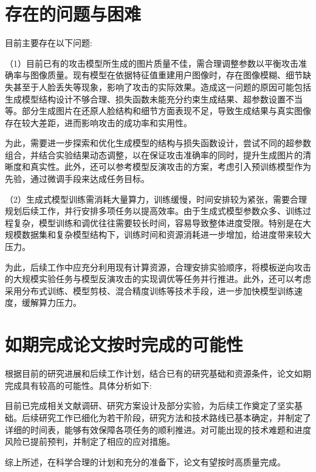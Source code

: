 \section{存在的问题与困难}
目前主要存在以下问题:

（1）目前已有的攻击模型所生成的图片质量不佳，需合理调整参数以平衡攻击准确率与图像质量。现有模型在依据特征值重建用户图像时，存在图像模糊、细节缺失甚至于人脸丢失等现象，影响了攻击的实际效果。造成这一问题的原因可能包括生成模型结构设计不够合理、损失函数未能充分约束生成结果、超参数设置不当等。部分生成图片在还原人脸结构和细节方面表现不足，导致生成结果与真实图像存在较大差距，进而影响攻击的成功率和实用性。

为此，需要进一步探索和优化生成模型的结构与损失函数设计，尝试不同的超参数组合，并结合实验结果动态调整，以在保证攻击准确率的同时，提升生成图片的清晰度和真实性。此外，还可以参考模型反演攻击的方案，考虑引入预训练模型作为先验，通过微调手段来达成任务目标。

（2）生成式模型训练需消耗大量算力，训练缓慢，时间安排较为紧张，需要合理规划后续工作，并行安排多项任务以提高效率。由于生成式模型参数众多、训练过程复杂，模型训练和调优往往需要较长时间，容易导致整体进度受限。特别是在大规模数据集和复杂模型结构下，训练时间和资源消耗进一步增加，给进度带来较大压力。

为此，后续工作中应充分利用现有计算资源，合理安排实验顺序，将模板逆向攻击的大规模实验任务与模型反演攻击的实现调优等任务并行推进。此外，还可以考虑采用分布式训练、模型剪枝、混合精度训练等技术手段，进一步加快模型训练速度，缓解算力压力。

\section{如期完成论文按时完成的可能性}
根据目前的研究进展和后续工作计划，结合已有的研究基础和资源条件，论文如期完成具有较高的可能性。具体分析如下:

目前已完成相关文献调研、研究方案设计及部分实验，为后续工作奠定了坚实基础。后续研究工作已细化为若干阶段，研究方法和技术路线已基本确定，并制定了详细的时间表，能够有效保障各项任务的顺利推进。对可能出现的技术难题和进度风险已提前预判，并制定了相应的应对措施。

综上所述，在科学合理的计划和充分的准备下，论文有望按时高质量完成。
% 
% 

